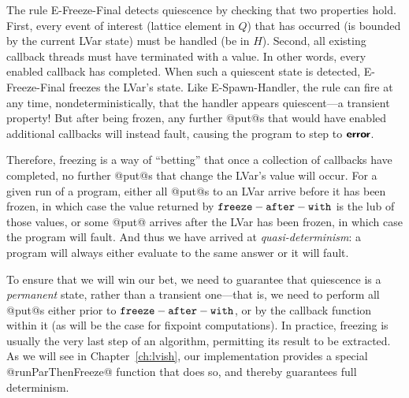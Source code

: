 The rule {\sc E-Freeze-Final} detects quiescence by checking that two
properties hold.  First, every event of interest (lattice element in
$Q$) that has occurred (is bounded by the current LVar state) must be
handled (be in $H$).  Second, all existing callback threads must have
terminated with a value.  In other words, every enabled callback has
completed.  When such a quiescent state is detected, {\sc
  E-Freeze-Final} freezes the LVar's state.  Like {\sc
  E-Spawn-Handler}, the rule can fire at any time,
nondeterministically, that the handler appears quiescent---a transient
property!  But after being frozen, any further @put@s that would have
enabled additional callbacks will instead fault, causing the program
to step to $\textbf{\textsf{error}}$.

Therefore, freezing is a way of ``betting'' that once a collection of
callbacks have completed, no further @put@s that change the LVar's
value will occur.  For a given run of a program, either all @put@s to
an LVar arrive before it has been frozen, in which case the value
returned by ${\mbox{\texttt{freeze}}-\mbox{\texttt{after}}-\mbox{\texttt{with}}}$ is the lub of those values, or some @put@ arrives
after the LVar has been frozen, in which case the program will fault.
And thus we have arrived at \emph{quasi-determinism}: a program will
always either evaluate to the same answer or it will fault.

To ensure that we will win our bet, we need to guarantee that
quiescence is a \emph{permanent} state, rather than a transient
one---that is, we need to perform all @put@s either prior to ${\mbox{\texttt{freeze}}-\mbox{\texttt{after}}-\mbox{\texttt{with}}}$,
or by the callback function within it (as will be the case for
fixpoint computations).  In practice, freezing is usually the very
last step of an algorithm, permitting its result to be extracted. As
we will see in Chapter~\ref{ch:lvish}, our implementation provides a
special @runParThenFreeze@ function that does so, and thereby
guarantees full determinism.
